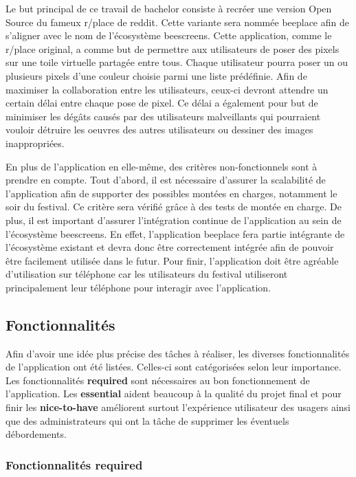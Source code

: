 Le but principal de ce travail de bachelor consiste à recréer une version Open Source du fameux r/place de \gls{reddit}. Cette variante sera nommée \gls{beeplace} afin de s'aligner avec le nom de l'écosystème \gls{beescreens}.
Cette application, comme le r/place original, a comme but de permettre aux utilisateurs de poser des pixels sur une toile virtuelle partagée entre tous. Chaque utilisateur pourra poser un ou plusieurs pixels d'une couleur choisie parmi une liste prédéfinie. Afin de maximiser la collaboration entre les utilisateurs, ceux-ci devront attendre un certain délai entre chaque pose de pixel. Ce délai a également pour but de minimiser les dégâts causés par des utilisateurs malveillants qui pourraient vouloir détruire les oeuvres des autres utilisateurs ou dessiner des images inappropriées.

En plus de l'application en elle-même, des critères non-fonctionnels sont à prendre en compte. Tout d'abord, il est nécessaire d'assurer la scalabilité de l'application afin de supporter des possibles montées en charges, notamment le soir du festival. Ce critère sera vérifié grâce à des tests de montée en charge. De plus, il est important d'assurer l'intégration continue de l'application au sein de l'écosystème \gls{beescreens}. En effet, l'application \gls{beeplace} fera partie intégrante de l'écosystème existant et devra donc être correctement intégrée afin de pouvoir être facilement utilisée dans le futur. Pour finir, l'application doit être agréable d'utilisation sur téléphone car les utilisateurs du festival utiliseront principalement leur téléphone pour interagir avec l'application.

\subsection{Fonctionnalités}

Afin d'avoir une idée plus précise des tâches à réaliser, les diverses fonctionnalités de l'application ont été listées. Celles-ci sont catégorisées selon leur importance. Les fonctionnalités \textbf{required} sont nécessaires au bon fonctionnement de l'application. Les \textbf{essential} aident beaucoup à la qualité du projet final et pour finir les \textbf{nice-to-have} améliorent surtout l'expérience utilisateur des usagers ainsi que des administrateurs qui ont la tâche de supprimer les éventuels débordements.

\subsubsection{Fonctionnalités \guillemotleft required\guillemotright}

